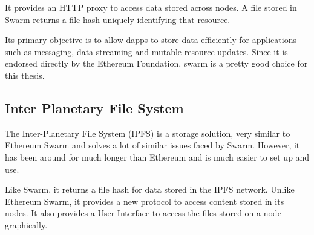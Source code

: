 \documentclass[11pt,openright]{report}
\begin{document}
It provides an HTTP proxy to access data stored across nodes. A file stored in Swarm returns a file hash uniquely identifying that resource.

Its primary objective is to allow dapps to store data efficiently for applications such as messaging, data streaming and mutable resource updates. Since it is endorsed directly by the Ethereum Foundation, swarm is a pretty good choice for this thesis.

\subsection{Inter Planetary File System}
The Inter-Planetary File System (IPFS) \cite{ipfs2014} is a storage solution, very similar to Ethereum Swarm and solves a lot of similar issues faced by Swarm. However, it has been around for much longer than Ethereum and is much easier to set up and use.

Like Swarm, it returns a file hash for data stored in the IPFS network. Unlike Ethereum Swarm, it provides a new protocol to access content stored in its nodes. It also provides a User Interface to access the files stored on a node graphically.
\end{document}
